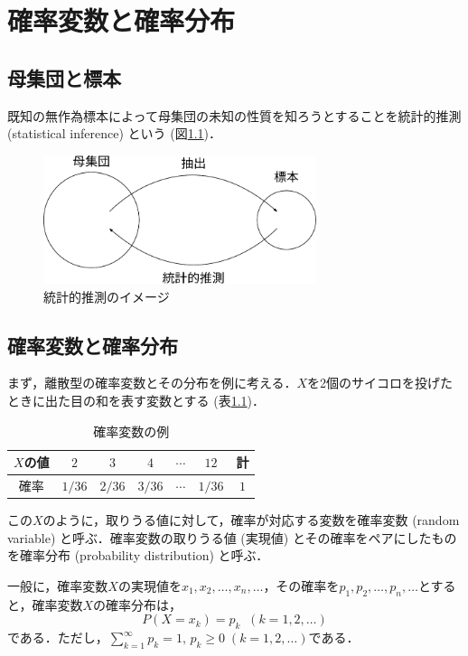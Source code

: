 \documentclass{jsreport}
\begin{document}
\chapter{確率変数と確率分布}
\section{母集団と標本}
既知の無作為標本によって母集団の未知の性質を知ろうとすることを統計的推測 (statistical inference) という (図\ref{fig:inf})．
\begin{figure}[htb]
  \centering
  \includegraphics[clip, width=8cm]{../figure/infer.pdf}
  \caption{統計的推測のイメージ}
  \label{fig:inf}
\end{figure}

\section{確率変数と確率分布}
まず，離散型の確率変数とその分布を例に考える．$X$を2個のサイコロを投げたときに出た目の和を表す変数とする (表\ref{tab:ex_pr})．
\begin{table}[htb]
  \centering
  \caption{確率変数の例}
  \begin{tabular}{c|ccccc|c}
    $X$の値 & $2$ & $3$ & $4$ & $\cdots$ & $12$ & 計 \\ \hline
    確率 & $1/36$ & $2/36$ & $3/36$ & $\cdots$ & $1/36$ & $1$ \\ \hline
  \end{tabular}
  \label{tab:ex_pr}
\end{table}

この$X$のように，取りうる値に対して，確率が対応する変数を確率変数 (random variable) と呼ぶ．確率変数の取りうる値 (実現値) とその確率をペアにしたものを確率分布 (probability distribution) と呼ぶ．

一般に，確率変数$X$の実現値を$x_1, x_2, \ldots, x_n, \ldots$，その確率を$p_1, p_2, \ldots, p_n, \ldots$とすると，確率変数$X$の確率分布は，
\begin{equation}
  P(X = x_k) = p_k \; \; (k = 1, 2, \ldots)
\end{equation}
である．ただし，$\sum_{k = 1}^{\infty} p_k = 1, \, p_k \geq 0 \; (k = 1, 2, \ldots)$である．
\end{document}
